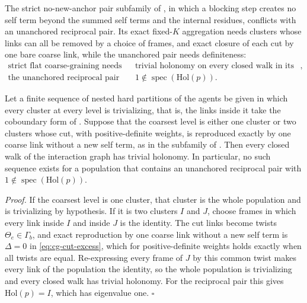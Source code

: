 The strict no-new-anchor pair subfamily of , in which a
blocking step creates no self term beyond the summed self terms and the internal residues,
conflicts with an unanchored reciprocal pair. Its exact fixed-\(K\) aggregation needs
clusters whose links can all be removed by a choice of frames, and exact closure of each
cut by one bare coarse link, while the unanchored pair needs definiteness:
\begin{equation}
\begin{aligned}
\text{strict flat coarse-graining needs}\quad
&\text{trivial holonomy on every closed walk in its domain},\\
\text{the unanchored reciprocal pair needs}\quad
&1\notin\operatorname{spec}(\mathrm{Hol}(p)).
\end{aligned}
\label{eq:obs-tension}
\end{equation}

Let a finite sequence of nested hard partitions of the agents be given in which every
cluster at every level is trivializing, that is, the links inside it take the coboundary
form of . Suppose that the coarsest level is either one
cluster or two clusters whose cut, with positive-definite weights, is reproduced exactly by
one coarse link without a new self term, as in the subfamily of
. Then every closed walk of the interaction graph has trivial
holonomy. In particular, no such sequence exists for a population that contains an
unanchored reciprocal pair with \(1\notin\operatorname{spec}(\mathrm{Hol}(p))\).

\noindent\emph{Proof.}
If the coarsest level is one cluster, that cluster is the whole population and is
trivializing by hypothesis. If it is two clusters \(I\) and \(J\), choose frames in which every
link inside \(I\) and inside \(J\) is the identity. The cut links become twists \(\Theta_e\in\Gamma_b\),
and exact reproduction by one coarse link without a new self term is \(\Delta=0\) in
\eqref{eq:cg-cut-excess}, which for positive-definite weights holds exactly when all twists
are equal. Re-expressing every frame of \(J\) by this common twist makes every link of the
population the identity, so the whole population is trivializing and every closed walk has
trivial holonomy. For the reciprocal pair this gives \(\mathrm{Hol}(p)=I\), which has eigenvalue
one. \hfill$\square$

